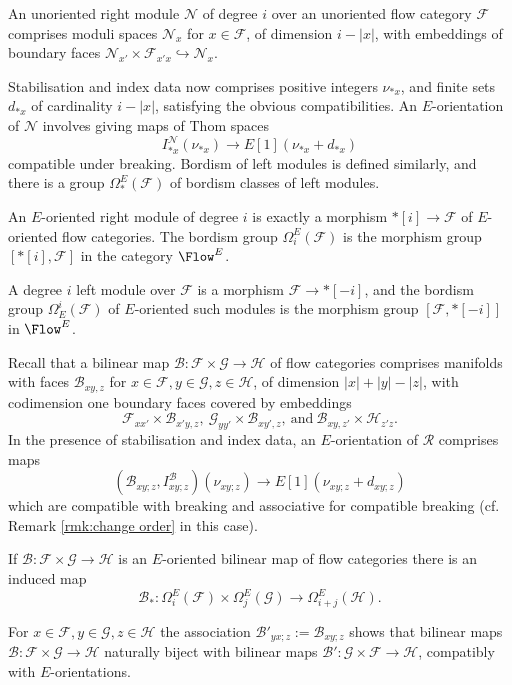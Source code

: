 \documentclass{TPmod}
\newcommand{\cB}{\mathcal{B}}
\newcommand{\cF}{\mathcal{F}}
\newcommand{\cG}{\mathcal{G}}
\newcommand{\cH}{\mathcal{H}}
\newcommand{\cN}{\mathcal{N}}
\newcommand{\cR}{\mathcal{R}}
\numberwithin{equation}{section}
\begin{document}
An unoriented right module $\cN$ of degree $i$ over an unoriented flow category $\cF$ comprises moduli spaces $\cN_x$ for $x\in \cF$, of dimension $i - |x|$, with embeddings of boundary faces $\cN_{x'} \times \cF_{x'x} \hookrightarrow \cN_x$. 

Stabilisation and index data now comprises positive integers $\nu_{*x}$, and finite sets $d_{*x}$ of cardinality $i-|x|$, satisfying the obvious compatibilities.  An $E$-orientation of $\cN$ involves giving maps of Thom spaces
\[
I^\cN_{\ast x}(\nu_{*x}) \to E[1](\nu_{*x} + d_{*x})
\]
compatible under breaking.  Bordism of left modules is defined similarly, and there is a group $\Omega_*^E(\cF)$ of bordism classes of left modules. 

\begin{rmk}
    An $E$-oriented right module of degree $i$ is exactly a morphism $\ast[i] \to \cF$ of $E$-oriented flow categories.  The bordism group $\Omega_i^E(\cF)$ is the morphism group $[\ast[i],\cF]$ in the category $\Flow^E$.

    A degree $i$ left module over $\cF$ is a morphism $\cF \to \ast[-i]$, and the bordism group $\Omega_E^i(\cF)$ of $E$-oriented such  modules is the morphism group $[\cF,\ast[-i]]$ in $\Flow^E$.
\end{rmk}


Recall that a bilinear map $\cB: \cF \times \cG \to \cH$ of flow categories comprises manifolds with faces $\cB_{xy,z}$ for $x\in\cF,y\in\cG,z\in\cH$, of dimension $|x|+|y|-|z|$, with codimension one boundary faces covered by embeddings
\[
\cF_{xx'}\times\cB_{x'y,z}, \ \cG_{yy'} \times \cB_{xy',z}, \ \mathrm{and} \ \cB_{xy,z'}\times\cH_{z'z}.
\]
In the presence of stabilisation and index data, an $E$-orientation of $\cR$ comprises maps 
\[
(\cB_{xy;z},I^\cB_{xy;z})(\nu_{xy;z}) \to E[1](\nu_{xy;z} + d_{xy;z})
\]
which are compatible with breaking and associative for compatible breaking (cf. Remark \ref{rmk:change order} in this case). 

If $\cB: \cF \times \cG \to \cH$ is an $E$-oriented bilinear map of flow categories there is an induced map
\begin{equation} \label{eqn:composition from bilinear map}
\cB_*: \Omega_i^E(\cF) \times \Omega_j^E(\cG) \to \Omega_{i+j}^E(\cH).
\end{equation}

\begin{rmk}\label{rmk:bilinear map bijection}
    For $x\in\cF, y\in \cG, z \in \cH$ the association $\cB'_{yx;z} := \cB_{xy;z}$ shows that bilinear maps $\cB: \cF \times \cG \to \cH$ naturally biject with bilinear maps $\cB': \cG \times \cF \to \cH$, compatibly with $E$-orientations.
\end{rmk}
\end{document}
